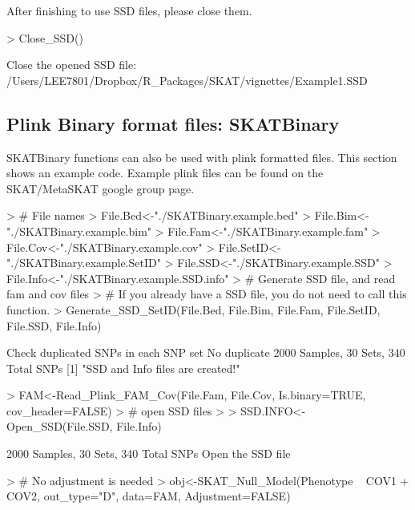 \documentclass[11pt]{article}
\begin{document}
After finishing to use SSD files, please close them.

\begin{Schunk}
\begin{Sinput}
> Close_SSD()
\end{Sinput}
\begin{Soutput}
Close the opened SSD file: /Users/LEE7801/Dropbox/R_Packages/SKAT/vignettes/Example1.SSD
\end{Soutput}
\end{Schunk}


\subsection{Plink Binary format files: SKATBinary}

SKATBinary functions can also be used with plink formatted files. This section shows 
an example code. Example plink files can be found on the SKAT/MetaSKAT google group page.

\begin{Schunk}
\begin{Sinput}
> # File names
> File.Bed<-"./SKATBinary.example.bed"
> File.Bim<-"./SKATBinary.example.bim"
> File.Fam<-"./SKATBinary.example.fam"
> File.Cov<-"./SKATBinary.example.cov"
> File.SetID<-"./SKATBinary.example.SetID"
> File.SSD<-"./SKATBinary.example.SSD"
> File.Info<-"./SKATBinary.example.SSD.info"
> # Generate SSD file, and read fam and cov files
> # If you already have a SSD file, you do not need to call this function. 
> Generate_SSD_SetID(File.Bed, File.Bim, File.Fam, File.SetID, File.SSD, File.Info)
\end{Sinput}
\begin{Soutput}
Check duplicated SNPs in each SNP set
No duplicate
2000 Samples, 30 Sets, 340 Total SNPs
[1] "SSD and Info files are created!"
\end{Soutput}
\begin{Sinput}
> FAM<-Read_Plink_FAM_Cov(File.Fam, File.Cov, Is.binary=TRUE, cov_header=FALSE)
> # open SSD files
>  
> SSD.INFO<-Open_SSD(File.SSD, File.Info)
\end{Sinput}
\begin{Soutput}
2000 Samples, 30 Sets, 340 Total SNPs
Open the SSD file
\end{Soutput}
\begin{Sinput}
> # No adjustment is needed
> obj<-SKAT_Null_Model(Phenotype ~ COV1 + COV2, out_type="D", data=FAM, Adjustment=FALSE)
\end{Sinput}
\end{Schunk}
\end{document}
